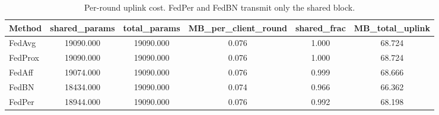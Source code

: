 \begin{table}
\caption{Per-round uplink cost. FedPer and FedBN transmit only the shared block.}
\label{tab:comm}
\begin{tabular}{lccccc}
\toprule
Method & shared_params & total_params & MB_per_client_round & shared_frac & MB_total_uplink \\
\midrule
FedAvg & 19090.000 & 19090.000 & 0.076 & 1.000 & 68.724 \\
FedProx & 19090.000 & 19090.000 & 0.076 & 1.000 & 68.724 \\
FedAff & 19074.000 & 19090.000 & 0.076 & 0.999 & 68.666 \\
FedBN & 18434.000 & 19090.000 & 0.074 & 0.966 & 66.362 \\
FedPer & 18944.000 & 19090.000 & 0.076 & 0.992 & 68.198 \\
\bottomrule
\end{tabular}
\end{table}
